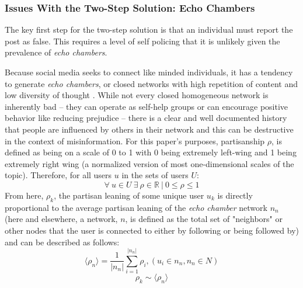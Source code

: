 \documentclass[12pt]{article}
\begin{document}
\subsubsection{Issues With the Two-Step Solution: Echo Chambers}
\label{sec: echo chambers}
 The key first step for the two-step solution is that an individual must report the post as false. This requires a level of self policing that it is unlikely given the prevalence of \textit{echo chambers}. 
 
Because social media seeks to connect like minded individuals, it has a tendency to generate \textit{echo chambers}, or closed networks with high repetition of content and low diversity of thought \cite{adibi2005proceedings, bastian2009international, pariser2011filter,bozdag2015breaking}. While not every closed homogeneous network is inherently bad -- they can operate as self-help groups \cite{kast2012under} or can encourage positive behavior like reducing prejudice \cite{paluck2011peer} -- there is a clear and well documented history that people are influenced by others in their network \cite{cialdini2004social,bollinger2012peer, bond201261,gerber2008social,gerber2009descriptive,meer2011brother,paluck2012salience,del2016spreading,bessi2015viral} and this can be destructive in the context of misinformation. For this paper's purposes, partisanship $\rho$, is defined as being on a scale of 0 to 1 with 0 being extremely left-wing and 1 being extremely right wing (a normalized version of most one-dimensional scales of the topic). Therefore, for all users $u$ in the sets of users $U$:
\begin{equation}
\label{basepartisanship}
    \forall \ u \in U \ \exists \ \rho \in \mathbb{R} \ | \ 0 \leq \rho \leq 1
\end{equation}
From here, $\rho_k$, the partisan leaning of some unique user $u_k$ is directly proportional to the average partisan leaning of the \textit{echo chamber} network $n_n$ (here and elsewhere, a network, $n$, is defined as the total set of "neighbors" or other nodes that the user is connected to either by following or being followed by) and can be described as follows:
 \begin{equation}
    \label{ech chamber}
        \langle \rho_n \rangle = \frac{1}{|n_n|}\sum_{i=1}^{|n_n|}{\rho_i}, (u_i \in n_n, n_n \in N)
 \end{equation}
 \begin{equation}
    \label{leaningproportionaltonetwork}
        \rho_k \sim \langle \rho_n \rangle
 \end{equation}
 
\end{document}
